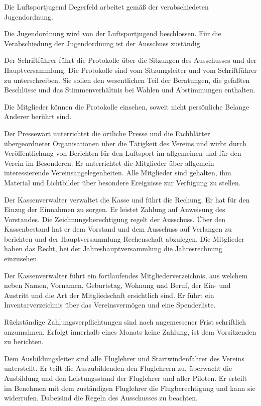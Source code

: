 \documentclass[10pt,a4paper,parskip=half]{scrartcl}
\begin{document}
\begin{contract}
    Die Luftsportjugend Degerfeld arbeitet gemäß der verabschiedeten Jugendordnung.
    
    Die Jugendordnung wird von der Luftsportjugend beschlossen. Für die Verabschiedung der Jugendordnung ist der Ausschuss zuständig.
    
    Der Schriftführer führt die Protokolle über die Sitzungen des Ausschusses und der Hauptversammlung.
    Die Protokolle sind vom Sitzungsleiter und vom Schriftführer zu unterschreiben.
    Sie sollen den wesentlichen Teil der Beratungen,
    die gefaßten Beschlüsse und das Stimmenverhältnis bei Wahlen und Abstimmungen enthalten.
    
    Die Mitglieder können die Protokolle einsehen,
    soweit nicht persönliche Belange Anderer berührt sind.
    
    Der Pressewart unterrichtet die örtliche Presse und die Fachblätter übergeordneter Organisationen über die Tätigkeit des Vereins und wirbt durch Veröffentlichung von Berichten für den Luftsport im allgemeinen und für den Verein im Besonderen.
    Er unterrichtet die Mitglieder über allgemein interessierende Vereinsangelegenheiten.
    Alle Mitglieder sind gehalten, ihm Material und Lichtbilder über besondere Ereignisse zur Verfügung zu stellen.
    
    Der Kassenverwalter verwaltet die Kasse und führt die Rechung.
    Er hat für den Einzug der Einnahmen zu sorgen.
    Er leistet Zahlung auf Anweisung des Vorstandes.
    Die Zeichnungsberechtigung regelt der Ausschuss.
    Über den Kassenbestand hat er dem Vorstand und dem Ausschuss auf Verlangen zu berichten und der Hauptversammlung Rechenschaft abzulegen.
    Die Mitglieder haben das Recht,
    bei der Jahreshauptversammlung die Jahresrechnung einzusehen.
    
    Der Kassenverwalter führt ein fortlaufendes Mitgliederverzeichnis,
    aus welchem neben Namen,
    Vornamen,
    Geburtstag,
    Wohnung und Beruf,
    der Ein- und Austritt und die Art der Mitgliedschaft ersichtlich sind.
    Er führt ein Inventarverzeichnis über das Vereinsvermögen und eine Spenderliste.
    
    Rückständige Zahlungsverpflichtungen sind nach angemessener Frist schriftlich anzumahnen.
    Erfolgt innerhalb eines Monats keine Zahlung,
    ist dem Vorsitzenden zu berichten.
    
    Dem Ausbildungsleiter sind alle Fluglehrer und Startwindenfahrer des Vereins unterstellt.
    Er teilt die Auszubildenden den Fluglehrern zu,
    überwacht die Ausbildung und den Leistungsstand der Fluglehrer und aller Piloten.
    Er erteilt im Benehmen mit dem zuständigen Fluglehrer die Flugberechtigung und kann sie widerrufen.
    Dabeisind die Regeln des Ausschusses zu beachten.
    

\end{contract}
\end{document}
